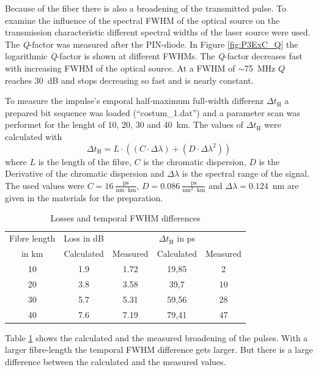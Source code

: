 Because of the fiber there is also a broadening of the transmitted pulse. To examine the influence of the spectral FWHM of the optical source on the transmission characteristic different spectral widths of the laser source were used. The \textit{Q}-factor was measured after the PIN-diode. In Figure \ref{fig:P3ExC_Q} the logarithmic \textit{Q}-factor is shown at different FWHMs. The \textit{Q}-factor decreases fast with increasing FWHM of the optical source. At a FWHM of $\sim$75~MHz $Q$ reaches 30~dB and stops decreasing so fast and is nearly constant.

To measure the impulse's emporal half-maximum full-width differenz $\Delta t_{\mathrm{H}}$ a prepared bit sequence was loaded ("`costum\_1.dat"') and a parameter scan was performet for the lenght of 10, 20, 30 and 40~km.
The values of $\Delta t_{\mathrm{H}}$ were calculated with
\begin{equation}
\Delta t_{\mathrm{H}} = L\cdot((C\cdot\Delta\lambda)+(D\cdot\Delta\lambda^2))
\label{eq:delta_t}
\end{equation}
where $L$ is the length of the fibre, $C$ is the chromatic dispersion, $D$ is the Derivative of the chromatic dispersion and $\Delta\lambda$ is the spectral range of the signal. The used values were $C=16~\frac{\mathrm{ps}}{\mathrm{nm}\cdot \mathrm{km}}$, $D=0.086~\frac{\mathrm{ps}}{\mathrm{nm}^2\cdot \mathrm{km}}$ and $\Delta\lambda=0.124$~nm are given in the materials for the preparation\footnotemark[3].

\begin{table}%
\centering
\caption{Losses and temporal FWHM differences}
\begin{tabular}{ccccc}

\toprule
Fibre length & Loss in dB&&$\Delta t_{\mathrm{H}}$ in ps&\\
in km&Calculated&Measured&Calculated&Measured\\
\midrule
10&	1.9&1.72&19,85	&2	\\
20&	3.8&3.58&39,7	&	10\\
30&	5.7&5.31&59,56	&	28\\
40&	7.6&7.19&79,41	&	47\\
\bottomrule 
\end{tabular}
\label{tab:P3ExB_loss}
\end{table}


Table \ref{tab:P3ExB_loss} shows the calculated and the measured broadening of the pulses. With a larger fibre-length the temporal FWHM difference gets larger. But there is a large difference between the calculated and the measured values. 